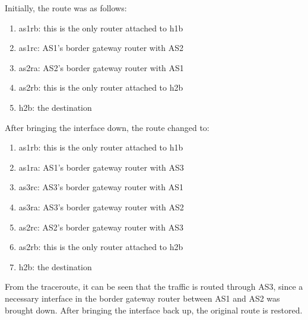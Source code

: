 Initially, the route was as follows:
\begin{enumerate}
    \item as1rb: this is the only router attached to h1b
    \item as1rc: AS1's border gateway router with AS2
    \item as2ra: AS2's border gateway router with AS1
    \item as2rb: this is the only router attached to h2b
    \item h2b: the destination
\end{enumerate}

After bringing the interface down, the route changed to:
\begin{enumerate}
    \item as1rb: this is the only router attached to h1b
    \item as1ra: AS1's border gateway router with AS3
    \item as3rc: AS3's border gateway router with AS1
    \item as3ra: AS3's border gateway router with AS2
    \item as2rc: AS2's border gateway router with AS3
    \item as2rb: this is the only router attached to h2b
    \item h2b: the destination
\end{enumerate}

From the traceroute, it can be seen that the traffic is routed through AS3, since a necessary interface in the border gateway router between AS1 and AS2 was brought down. After bringing the interface back up, the original route is restored.\\

